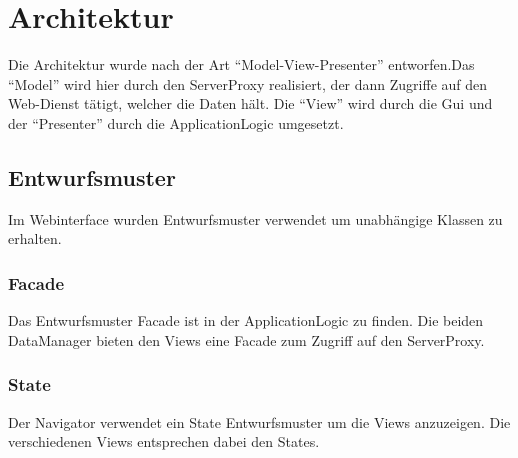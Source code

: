 \section{Architektur}
Die Architektur wurde nach der Art ``Model-View-Presenter'' entworfen.Das ``Model'' wird hier durch den ServerProxy realisiert, der dann Zugriffe auf den Web-Dienst tätigt, welcher die Daten hält. Die ``View'' wird durch die Gui und der ``Presenter'' durch die ApplicationLogic umgesetzt.

\subsection{Entwurfsmuster}
Im Webinterface wurden Entwurfsmuster verwendet um unabhängige Klassen zu erhalten.

\subsubsection{Facade}
Das Entwurfsmuster Facade ist in der ApplicationLogic zu finden. Die beiden DataManager bieten den Views eine Facade zum Zugriff auf den ServerProxy.

\subsubsection{State}
Der Navigator verwendet ein State Entwurfsmuster um die Views anzuzeigen. Die verschiedenen Views entsprechen dabei den States.
